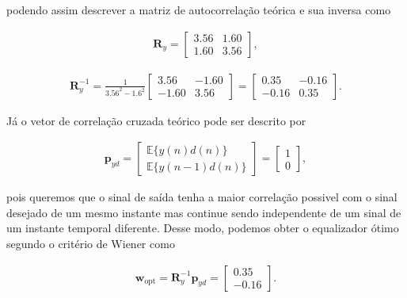 \documentclass[a4paper,10pt]{article}
\begin{document}
\begin{enumerate}
\begin{enumerate}
						podendo assim descrever a matriz de autocorrelação teórica e sua inversa como
						
						\begin{align}
							\mathbf{R}_{y} =
							\begin{bmatrix}
								3.56 & 1.60 \\
								1.60 & 3.56
							\end{bmatrix},
						\end{align}
						
						\begin{align}
							\mathbf{R}^{-1}_{y} = \frac{1}{3.56^{2} - 1.6^{2}}
							\begin{bmatrix}
								3.56 &  -1.60 \\
								-1.60 & 3.56
							\end{bmatrix} =
							\begin{bmatrix}
								0.35 &  -0.16 \\
								-0.16 & 0.35
							\end{bmatrix}.
						\end{align}
						
						Já o vetor de correlação cruzada teórico pode ser descrito por
						
						\begin{align}
							\mathbf{p}_{yd} =
							\begin{bmatrix}
								\mathbb{E}\{y(n)d(n)\} \\
								\mathbb{E}\{y(n - 1)d(n)\}
							\end{bmatrix} = 
							\begin{bmatrix}
								1 \\
								0
							\end{bmatrix},
						\end{align}
						
						pois queremos que o sinal de saída tenha a maior correlação possivel com o sinal desejado de um mesmo instante mas continue sendo independente de um sinal de um instante temporal diferente.
						Desse modo, podemos obter o equalizador ótimo segundo o critério de Wiener como
						
						\begin{align}
							\mathbf{w}_{\text{opt}} = \mathbf{R}^{-1}_{y} \mathbf{p}_{yd} = \begin{bmatrix}
								0.35 \\
								-0.16
							\end{bmatrix}.
						\end{align}
						

\end{enumerate}
\end{enumerate}
\end{document}
